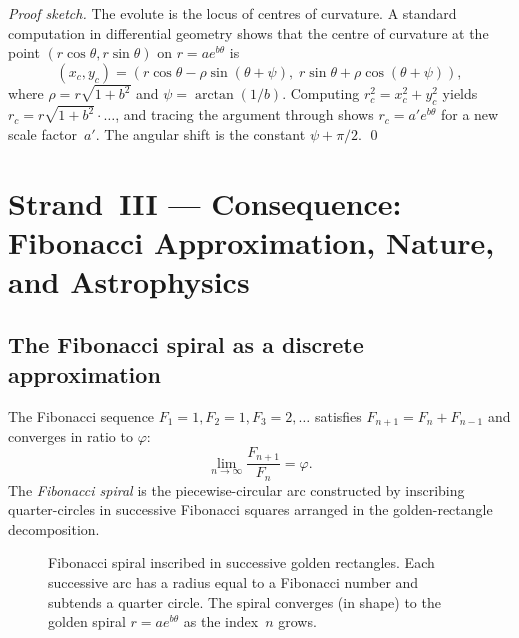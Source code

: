\begin{proof}[Proof sketch]
The evolute is the locus of centres of curvature.  A standard
computation in differential geometry \cite{boyer_history} shows
that the centre of curvature at the point
\((r\cos\theta, r\sin\theta)\) on \(r = ae^{b\theta}\) is
\[
  (x_c, y_c) = (r\cos\theta - \rho\sin(\theta+\psi),\;
                r\sin\theta + \rho\cos(\theta+\psi)),
\]
where \(\rho = r\sqrt{1+b^2}\) and \(\psi = \arctan(1/b)\).
Computing \(r_c^2 = x_c^2 + y_c^2\) yields
\(r_c = r\sqrt{1+b^2}\cdot\ldots\), and tracing the argument
through shows \(r_c = a'e^{b\theta}\) for a new scale
factor~\(a'\).  The angular shift is the constant \(\psi + \pi/2\).
\qed
\end{proof}

\section{Strand~III — Consequence: Fibonacci Approximation, Nature,
and Astrophysics}
\label{sec:17-strand3}

\subsection{The Fibonacci spiral as a discrete approximation}
\label{subsec:17-fibonacci}

The Fibonacci sequence \(F_1=1, F_2=1, F_3=2, \ldots\) satisfies
\(F_{n+1} = F_n + F_{n-1}\) and converges in ratio to \(\varphi\):
\[
  \lim_{n\to\infty}\frac{F_{n+1}}{F_n} = \varphi.
\]
The \emph{Fibonacci spiral} is the piecewise-circular arc
constructed by inscribing quarter-circles in successive
Fibonacci squares arranged in the golden-rectangle decomposition.

\begin{figure}[H]
\centering
\caption{Fibonacci spiral inscribed in successive golden rectangles.
Each successive arc has a radius equal to a Fibonacci number and
subtends a quarter circle.  The spiral converges (in shape) to the
golden spiral \(r = ae^{b\theta}\) as the index~\(n\) grows.}
\label{fig:fibonacci-spiral}
\end{figure}

